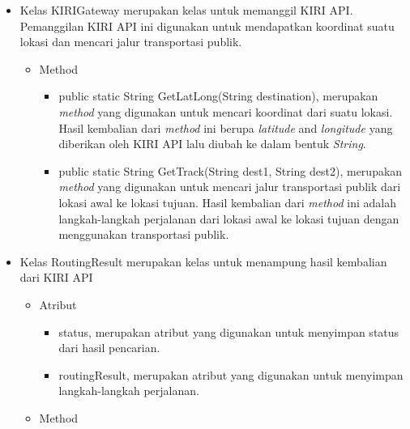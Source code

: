 \begin{itemize}
		\item Kelas KIRIGateway merupakan kelas untuk memanggil KIRI API. Pemanggilan KIRI API ini digunakan untuk mendapatkan koordinat suatu lokasi dan mencari jalur transportasi publik.
		
		
				\begin{itemize}
							\item Method
							
							
									\begin{itemize}
												\item public static String GetLatLong(String destination), merupakan \textit{method} yang digunakan untuk mencari koordinat dari suatu lokasi. Hasil kembalian dari \textit{method} ini berupa \textit{latitude} and \textit{longitude} yang diberikan oleh KIRI API lalu diubah ke dalam bentuk \textit{String}.
												\item public static String GetTrack(String dest1, String dest2), merupakan \textit{method} yang digunakan untuk mencari jalur transportasi publik dari lokasi awal ke lokasi tujuan. Hasil kembalian dari \textit{method} ini adalah langkah-langkah perjalanan dari lokasi awal ke lokasi tujuan dengan menggunakan transportasi publik.
									\end{itemize}
				\end{itemize}
		
		
		\item Kelas RoutingResult merupakan kelas untuk menampung hasil kembalian dari KIRI API
		
		
				\begin{itemize}
							\item Atribut
					
					
									\begin{itemize}
												\item status, merupakan atribut yang digunakan untuk menyimpan status dari hasil pencarian.
												\item routingResult, merupakan atribut yang digunakan untuk menyimpan langkah-langkah perjalanan.
									\end{itemize}
					
							\item Method
					

\end{itemize}
\end{itemize}
